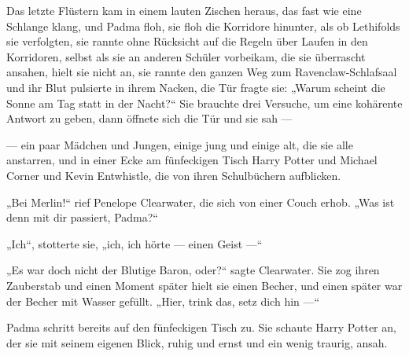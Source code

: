 Das letzte Flüstern kam in einem lauten Zischen heraus, das fast wie eine Schlange klang, und Padma floh, sie floh die Korridore hinunter, als ob Lethifolds sie verfolgten, sie rannte ohne Rücksicht auf die Regeln über Laufen in den Korridoren, selbst als sie an anderen Schüler vorbeikam, die sie überrascht ansahen, hielt sie nicht an, sie rannte den ganzen Weg zum Ravenclaw-Schlafsaal und ihr Blut pulsierte in ihrem Nacken, die Tür fragte sie:
„Warum scheint die Sonne am Tag statt in der Nacht?“ Sie brauchte drei Versuche, um eine kohärente Antwort zu geben, dann öffnete sich die Tür und sie sah —

— ein paar Mädchen und Jungen, einige jung und einige alt, die sie alle anstarren, und in einer Ecke am fünfeckigen Tisch Harry Potter und Michael Corner und Kevin Entwhistle, die von ihren Schulbüchern aufblicken.

„Bei Merlin!“ rief Penelope Clearwater, die sich von einer Couch erhob.
„Was ist denn mit dir passiert, Padma?“

„Ich“, stotterte sie, „ich, ich hörte — einen Geist —“

„Es war doch nicht der Blutige Baron, oder?“ sagte Clearwater. Sie zog ihren Zauberstab und einen Moment später hielt sie einen Becher, und einen  später war der Becher mit Wasser gefüllt.
„Hier, trink das, setz dich hin —“

Padma schritt bereits auf den fünfeckigen Tisch zu. Sie schaute Harry Potter an, der sie mit seinem eigenen Blick, ruhig und ernst und ein wenig traurig, ansah.

